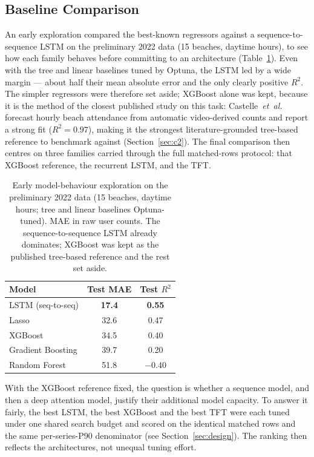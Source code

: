 \documentclass[twocolumn,twoside,a4paper,10pt]{IEEEtran}
\begin{document}
\subsection{Baseline Comparison}\label{sec:baselines}

An early exploration compared the best-known regressors against a sequence-to-sequence LSTM on the preliminary 2022 data (15 beaches, daytime hours), to see how each family behaves before committing to an architecture (Table~\ref{tab:early_baselines}). Even with the tree and linear baselines tuned by Optuna, the LSTM led by a wide margin --- about half their mean absolute error and the only clearly positive $R^2$. The simpler regressors were therefore set aside; XGBoost alone was kept, because it is the method of the closest published study on this task: Castelle~\emph{et~al.}~\cite{Castelle2025} forecast hourly beach attendance from automatic video-derived counts and report a strong fit ($R^2{=}0.97$), making it the strongest literature-grounded tree-based reference to benchmark against (Section~\ref{sec:c2}). The final comparison then centres on three families carried through the full matched-rows protocol: that XGBoost reference, the recurrent LSTM, and the TFT.

\begin{table}[!ht]
    \caption{Early model-behaviour exploration on the preliminary 2022 data (15 beaches, daytime hours; tree and linear baselines Optuna-tuned). MAE in raw user counts. The sequence-to-sequence LSTM already dominates; XGBoost was kept as the published tree-based reference and the rest set aside.}
    \label{tab:early_baselines}
    \begin{center}
    \footnotesize
    \begin{tabular}{lcc}
        \toprule
        Model & Test MAE & Test $R^2$ \\
        \midrule
        LSTM (seq-to-seq)  & \textbf{17.4} & \textbf{0.55} \\
        Lasso              & 32.6 & 0.47 \\
        XGBoost            & 34.5 & 0.40 \\
        Gradient Boosting  & 39.7 & 0.20 \\
        Random Forest      & 51.8 & $-0.40$ \\
        \bottomrule
    \end{tabular}
    \end{center}
\end{table}

With the XGBoost reference fixed, the question is whether a sequence model, and then a deep attention model, justify their additional model capacity. To answer it fairly, the best LSTM, the best XGBoost and the best TFT were each tuned under one shared search budget and scored on the identical matched rows and the same per-series-P90 denominator (see Section~\ref{sec:design}). The ranking then reflects the architectures, not unequal tuning effort.
\end{document}
